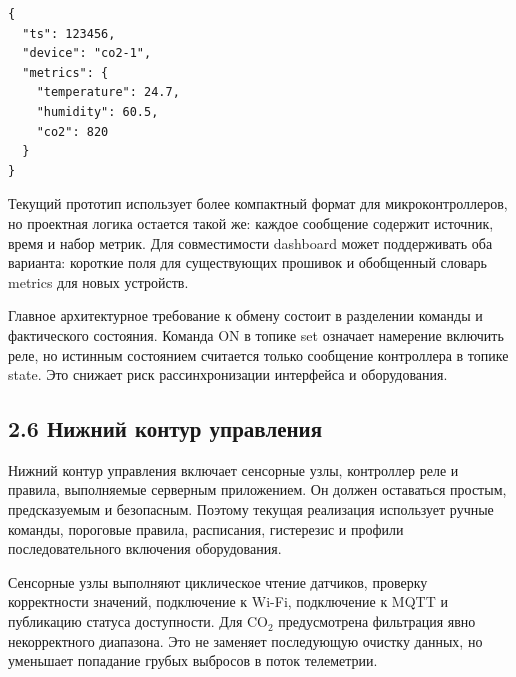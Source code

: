 \documentclass[a4paper,14pt]{extarticle}
\renewcommand{\texttt}[1]{\textnormal{#1}}
\begin{document}
\par\vspace{10pt}\noindent\begin{minipage}{\linewidth}
\nopagebreak
\setlength{\topsep}{3pt}\setlength{\partopsep}{0pt}
\begin{verbatim}
{
  "ts": 123456,
  "device": "co2-1",
  "metrics": {
    "temperature": 24.7,
    "humidity": 60.5,
    "co2": 820
  }
}
\end{verbatim}
\end{minipage}\par\vspace{8pt}

Текущий прототип использует более компактный формат для
микроконтроллеров, но проектная логика остается такой же: каждое
сообщение содержит источник, время и набор метрик. Для совместимости
dashboard может поддерживать оба варианта: короткие поля для
существующих прошивок и обобщенный словарь \texttt{metrics} для новых
устройств.

Главное архитектурное требование к обмену состоит в разделении команды и
фактического состояния. Команда \texttt{ON} в топике \texttt{set}
означает намерение включить реле, но истинным состоянием считается
только сообщение контроллера в топике \texttt{state}. Это снижает риск
рассинхронизации интерфейса и оборудования.

\hypertarget{ux43dux438ux436ux43dux438ux439-ux43aux43eux43dux442ux443ux440-ux443ux43fux440ux430ux432ux43bux435ux43dux438ux44f}{%
\subsection{2.6 Нижний контур
управления}\label{ux43dux438ux436ux43dux438ux439-ux43aux43eux43dux442ux443ux440-ux443ux43fux440ux430ux432ux43bux435ux43dux438ux44f}}

Нижний контур управления включает сенсорные узлы, контроллер реле и
правила, выполняемые серверным приложением. Он должен оставаться
простым, предсказуемым и безопасным. Поэтому текущая реализация
использует ручные команды, пороговые правила, расписания, гистерезис и
профили последовательного включения оборудования.

Сенсорные узлы выполняют циклическое чтение датчиков, проверку
корректности значений, подключение к Wi-Fi, подключение к MQTT и
публикацию статуса доступности. Для CO\(_2\) предусмотрена фильтрация
явно некорректного диапазона. Это не заменяет последующую очистку
данных, но уменьшает попадание грубых выбросов в поток телеметрии.
\end{document}
